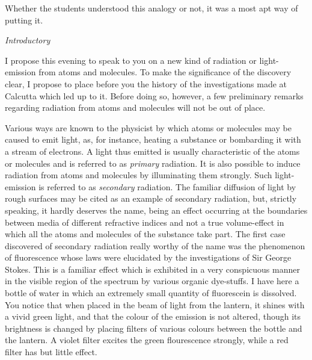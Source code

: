 Whether the students understood this analogy or not, it was a most apt way of putting it.

\bigskip
{}



\smallskip
\noindent
{\em Introductory}

\smallskip
I propose this evening to speak to you on a new kind of radiation or light-emission from atoms and molecules. To make the significance of the discovery clear, I propose to place before you the history of the investigations made at Calcutta which led up to it. Before doing so, however, a few preliminary remarks regarding radiation from atoms and molecules will not be out of place.

Various ways are known to the physicist by which atoms or mole\-cules may be caused to emit light, as, for instance, heating a substance or bombarding it with a stream of electrons. A light thus emitted is usually characteristic of the atoms or molecules and is referred to as {\em primary} radiation. It is also possible to induce radiation from atoms and molecules by illuminating them strongly. Such light-emission is referred to as {\em secondary} radiation. The familiar diffusion of light by rough surfaces may be cited as an example of secondary radiation, but, strictly speaking, it hardly deserves the name, being an effect occurring at the boundaries between media of different refractive indices and not a true volume-effect in which all the atoms and molecules of the substance take part. The first case discovered of secondary radiation really worthy of the name was the phenomenon of fluorescence whose laws were elucidated by the investigations of Sir George Stokes. This is a familiar effect which is exhibited in a very conspicuous manner in the visible region of the spectrum by various organic dye-stuffs. I have here a bottle of water in which an extremely small quantity of fluorescein is dissolved. You notice that when placed in the beam of light from the lantern, it shines with a vivid green light, and that the colour of the emission is not altered, though its brightness is changed by placing filters of various colours between the bottle and the lantern. A violet filter excites the green flourescence strongly, while a red filter has but little effect.

